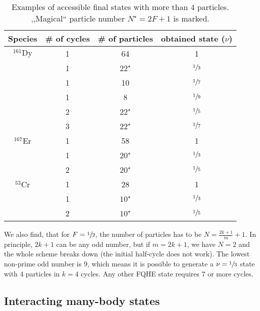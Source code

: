\begin{table}[ht]
    \centering
    \begin{tabular}{cccc}
    \hline
    Species & \# of cycles & \# of particles & obtained state ($\nu$) \\
    \toprule
    $^{161}\text{Dy}$ & 1 & 64 & 1 \\
    & 1 & $22^\star$ & $\sfrac{1}{3}$ \\
    & 1 & 10 & $\sfrac{1}{7}$ \\
    & 1 & 8 & $\sfrac{1}{9}$ \\
    & 2 & $22^\star$ & $\sfrac{1}{5}$ \\
    & 3 & $22^\star$ & $\sfrac{1}{7}$ \\
    \midrule
    $^{167}\text{Er}$ & 1 & 58 & 1 \\
    & 1 & $20^\star$ & $\sfrac{1}{3}$ \\
    & 2 & $20^\star$ & $\sfrac{1}{5}$ \\
    \midrule
    $^{53}\text{Cr}$ & 1 & 28 & 1 \\
    & 1 & $10^\star$ & $\sfrac{1}{3}$ \\
    & 2 & $10^\star$ & $\sfrac{1}{5}$ \\
    \hline
    \end{tabular}
    \caption{Examples of accessible final states with more than $4$ particles. ,,Magical`` particle number $N^\star=2F+1$ is marked.}
\end{table}

We also find, that for $F=\sfrac{1}{2}$, the number of particles has to be $N=\frac{2k+1}{m}+1$. In principle, $2k+1$ can be any odd number, but if $m=2k+1$, we have $N=2$ and the whole scheme breaks down (the initial half-cycle does not work). The lowest non-prime odd number is $9$, which means it is possible to generate a $\nu=\sfrac{1}{3}$ state with $4$ particles in $k=4$ cycles. Any other FQHE state requires $7$ or more cycles.


\subsection{Interacting many-body states}
